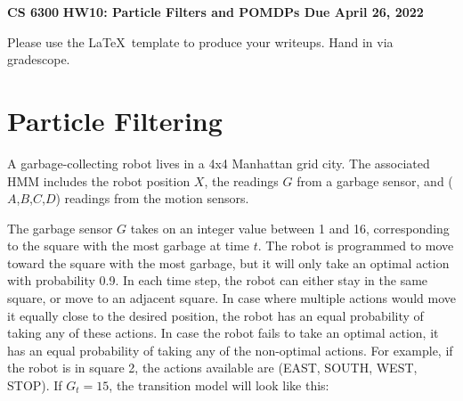 \documentclass[12pt]{article}
\begin{document}
\begin{center}
{\bf CS 6300} \hfill {\large\bf HW10: Particle Filters and POMDPs \hfill Due April 26, 2022}
\end{center}

\noindent
Please use the \LaTeX\ template to produce your writeups.  Hand in via
gradescope.

\section{Particle Filtering}
  
A garbage-collecting robot lives in a 4x4 Manhattan grid city.  The
associated HMM includes the robot position $X$, the readings $G$ from
a garbage sensor, and ($A$,$B$,$C$,$D$) readings from the motion
sensors.

\begin{figure}[h]
\end{figure}
  
The garbage sensor $G$ takes on an integer value between 1 and 16,
corresponding to the square with the most garbage at time $t$.  The
robot is programmed to move toward the square with the most garbage,
but it will only take an optimal action with probability 0.9.  In each
time step, the robot can either stay in the same square, or move to an
adjacent square. In case where multiple actions would move it equally
close to the desired position, the robot has an equal probability of
taking any of these actions. In case the robot fails to take an
optimal action, it has an equal probability of taking any of the
non-optimal actions. For example, if the robot is in square 2, the
actions available are (EAST, SOUTH, WEST, STOP). If $G_t = 15$, the
transition model will look like this:
\end{document}

